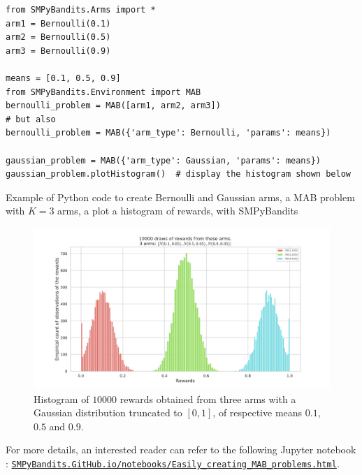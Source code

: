 \begin{small}
\begin{listing}[h!]
    \begin{verbatim}
from SMPyBandits.Arms import *
arm1 = Bernoulli(0.1)
arm2 = Bernoulli(0.5)
arm3 = Bernoulli(0.9)

means = [0.1, 0.5, 0.9]
from SMPyBandits.Environment import MAB
bernoulli_problem = MAB([arm1, arm2, arm3])
# but also
bernoulli_problem = MAB({'arm_type': Bernoulli, 'params': means})

gaussian_problem = MAB({'arm_type': Gaussian, 'params': means})
gaussian_problem.plotHistogram()  # display the histogram shown below
    \end{verbatim}
    \caption{Example of Python code to create Bernoulli and Gaussian arms, a MAB problem with $K=3$ arms, a plot a histogram of rewards, with SMPyBandits}
    \label{lst:3:pythonCodeCreateProblem}
\end{listing}
\end{small}

\begin{figure}[h!]  %
	\centering
	\includegraphics[width=0.75\linewidth]{exampleOfRewards.pdf}
	\caption{Histogram of $10000$ \iid{} rewards obtained from three arms with a Gaussian distribution truncated to $[0,1]$, of respective means $0.1$, $0.5$ and $0.9$.}
	\label{fig:3:exampleOfRewards}
\end{figure}

For more details, an interested reader can refer to the following Jupyter notebook \cite{jupyter}:
\href{https://smpybandits.github.io/notebooks/Easily_creating_MAB_problems.html}{\texttt{SMPyBandits.GitHub.io/notebooks/Easily\_creating\_MAB\_problems.html}}.

